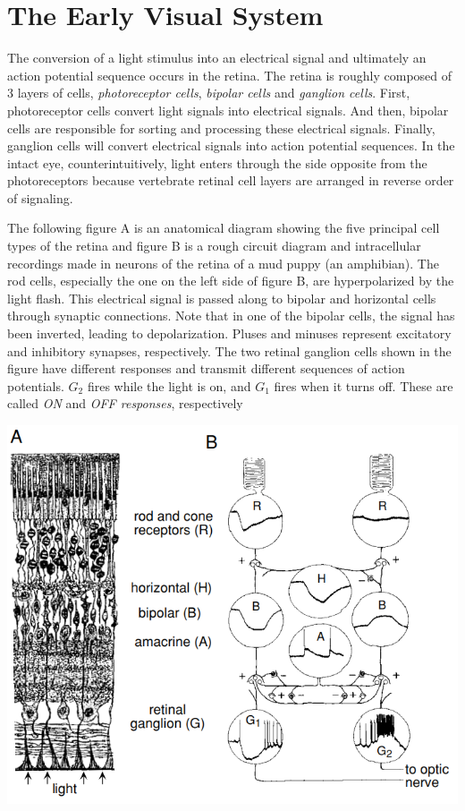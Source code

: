 \section{The Early Visual System}
\label{sec:EarlyVisualSystem}
\begin{prin}
  \label{prin:retina}
  The conversion of a light stimulus into an electrical signal and ultimately an action potential sequence occurs in the retina.
  The retina is roughly composed of 3 layers of cells, \emph{photoreceptor cells}, \emph{bipolar cells} and \emph{ganglion cells}. First, photoreceptor cells convert light signals into electrical signals. And then, bipolar cells are responsible for sorting and processing these electrical signals. Finally, ganglion cells will convert electrical signals into action potential sequences.
   In the intact eye, counterintuitively, light enters through the side opposite from the photoreceptors because vertebrate retinal cell layers are arranged in reverse order of signaling.
\end{prin}

\begin{exm}
  The following figure A is an anatomical diagram showing the five principal cell types of the retina and figure B is a rough circuit diagram and intracellular recordings made in neurons of the retina of a mud puppy (an amphibian). The rod cells, especially the one on the left side of figure B, are hyperpolarized by the light flash. This electrical signal is passed along to bipolar and horizontal cells through synaptic connections. Note that in one of the bipolar cells, the signal has been inverted, leading to depolarization. Pluses and minuses represent excitatory and inhibitory synapses, respectively.
  The two retinal ganglion cells shown in the figure have different responses and transmit different sequences of action potentials. $G_2$ fires while the light is on, and $G_1$ fires when it turns off. These are called \emph{ON} and \emph{OFF responses}, respectively
  \begin{center}
    \includegraphics[scale=0.25]{./png/dogRetina}
  \end{center}
\end{exm}

